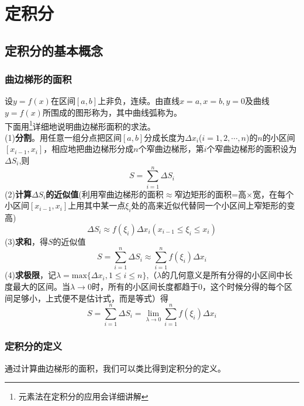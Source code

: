     \chapter{定积分}
\section{定积分的基本概念}
\subsection{曲边梯形的面积}
设$y=f(x)$在区间$[a,b]$上非负，连续。由直线$x=a,x=b,y=0$及曲线$y=f(x)$所围成的图形称为，其中曲线弧称为。\\
\thispagestyle{empty}
\kg 下面用\footnote{元素法在定积分的应用会详细讲解}详细地说明曲边梯形面积的求法。\\
\kg (1)\enspace\textbf{分割}。用任意一组分点把区间$[a,b]$分成长度为$\Delta x_i$($i=1,2,\cdots,n$)的$n$的小区间$[x_{i-1},x_i]$，相应地把曲边梯形分成$n$个窄曲边梯形，第$i$个窄曲边梯形的面积设为$\Delta S_i$,则
\begin{equation}
	S=\sum_{i=1}^{n}\Delta S_i
\end{equation}
\kg (2)\textbf{计算$\Delta S_i$的近似值}(利用窄曲边梯形的面积$\approx$窄边矩形的面积=高$\times$宽，在每个小区间$[x_{i-1},x_i]$上用其中某一点$\xi_i$处的高来近似代替同一个小区间上窄矩形的变高)
\begin{equation}
	\Delta S_i\approx f(\xi_i)\Delta x_i(x_{i-1}\leq \xi_i\leq x_i)
\end{equation}
\kg (3)\textbf{求和}，得$S$的近似值
\begin{equation}
	S=\sum_{i=1}^{n}\Delta S_i\approx\sum_{i=1}^{n} f(\xi_i)\Delta x_i
\end{equation}
\kg (4)\textbf{求极限}，记$\lambda=\text{max}\{\Delta x_i,1\leq i\leq n\}$,（$\lambda$的几何意义是所有分得的小区间中长度最大的区间。当$\lambda\to0$时，所有的小区间长度都趋于0，这个时候分得的每个区间足够小，上式便不是估计式，而是等式）得
\begin{equation}
	S=\sum_{i=1}^{n}\Delta S_i=\lim\limits_{\lambda\to 0}\sum_{i=1}^{n}f(\xi_i)\Delta x_i
\end{equation}
\subsection{定积分的定义}
通过计算曲边梯形的面积，我们可以类比得到定积分的定义。
\\ 

